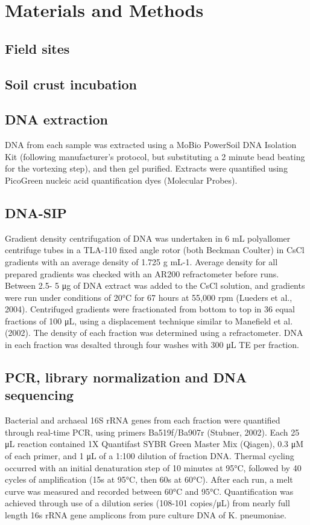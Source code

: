 \section{Materials and Methods}
\subsection{Field sites}
\subsection{Soil crust incubation}
\subsection{DNA extraction}
DNA from each sample was extracted using a MoBio PowerSoil DNA Isolation Kit (following manufacturer’s protocol, but substituting a 2 minute bead beating for the vortexing step), and then gel purified. Extracts were quantified using PicoGreen nucleic acid quantification dyes (Molecular Probes). 
\subsection{DNA-SIP}
 Gradient density centrifugation of DNA was undertaken in 6 mL polyallomer centrifuge tubes in a TLA-110 fixed angle rotor (both Beckman Coulter) in CsCl gradients with an average density of 1.725 g mL-1.  Average density for all prepared gradients was checked with an AR200 refractometer before runs. Between 2.5- 5 μg of DNA extract was added to the CsCl solution, and gradients were run under conditions of 20°C for 67 hours at 55,000 rpm (Lueders et al., 2004). Centrifuged gradients were fractionated from bottom to top in 36 equal fractions of 100 μL, using a displacement technique similar to Manefield et al. (2002). The density of each fraction was determined using a refractometer. DNA in each fraction was desalted through four washes with 300 μL TE per fraction. 
\subsection{PCR, library normalization and DNA sequencing}
Bacterial and archaeal 16S rRNA genes from each fraction were quantified through real-time PCR, using primers Ba519f/Ba907r (Stubner, 2002).  Each 25 μL reaction contained 1X Quantifast SYBR Green Master Mix (Qiagen), 0.3 μM of each primer, and 1 μL of a 1:100 dilution of fraction DNA. Thermal cycling occurred with an initial denaturation step of 10 minutes at 95°C, followed by 40 cycles of amplification (15s at 95°C, then 60s at 60°C). After each run, a melt curve was measured and recorded between 60°C and 95°C. Quantification was achieved through use of a dilution series (108-101 copies/μL) from nearly full length 16s rRNA gene amplicons from pure culture DNA of K. pneumoniae. 

